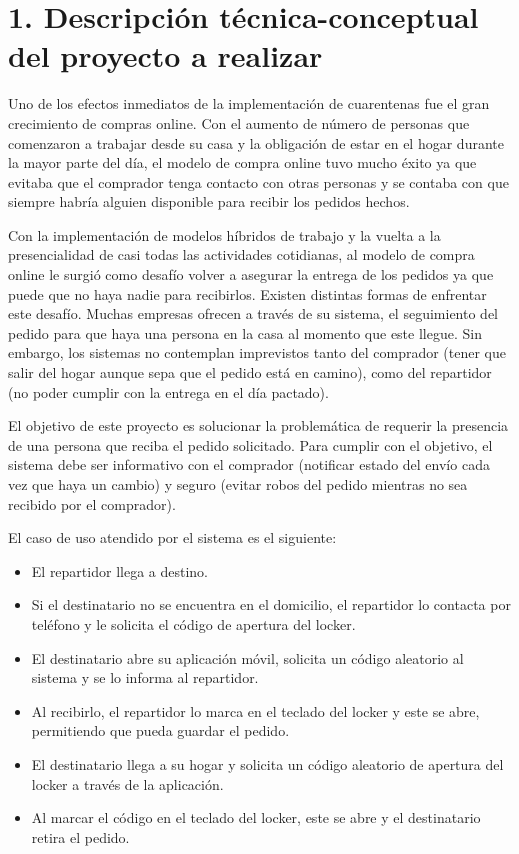 \documentclass[
11pt, %
]{charter}
\begin{document}
\section{1. Descripción técnica-conceptual del proyecto a realizar}
\label{sec:descripcion}


Uno de los efectos inmediatos de la implementación de cuarentenas fue el gran crecimiento de compras online. Con el aumento de número de personas que comenzaron a trabajar desde su casa y la obligación de estar en el hogar durante la mayor parte del día, el modelo de compra online tuvo mucho éxito ya que evitaba que el comprador tenga contacto con otras personas y se contaba con que siempre habría alguien disponible para recibir los pedidos hechos.

Con la implementación de modelos híbridos de trabajo y la vuelta a la presencialidad de casi todas las actividades cotidianas, al modelo de compra online le surgió como desafío volver a asegurar la entrega de los pedidos ya que puede que no haya nadie para recibirlos.
Existen distintas formas de enfrentar este desafío. Muchas empresas ofrecen a través de su sistema, el seguimiento del pedido para que haya una persona en la casa al momento que este llegue. Sin embargo, los sistemas no contemplan imprevistos tanto del comprador (tener que salir del hogar aunque sepa que el pedido está en camino), como del repartidor (no poder cumplir con la entrega en el día pactado).

El objetivo de este proyecto es solucionar la problemática de requerir la presencia de una persona que reciba el pedido solicitado.
Para cumplir con el objetivo, el sistema debe ser informativo con el comprador (notificar estado del envío cada vez que haya un cambio) y seguro (evitar robos del pedido mientras no sea recibido por el comprador).

El caso de uso atendido por el sistema es el siguiente:

\begin{itemize}
	\item El repartidor llega a destino.
	\item Si el destinatario no se encuentra en el domicilio, el repartidor lo contacta por teléfono y le solicita el código de apertura del locker.
	\item El destinatario abre su aplicación móvil, solicita un código aleatorio al sistema y se lo informa al repartidor.
	\item Al recibirlo, el repartidor lo marca en el teclado del locker y este se abre, permitiendo que pueda guardar el pedido.
	\item El destinatario llega a su hogar y solicita un código aleatorio de apertura del locker a través de la aplicación.
	\item Al marcar el código en el teclado del locker, este se abre y el destinatario retira el pedido.
\end{itemize}
\end{document}
